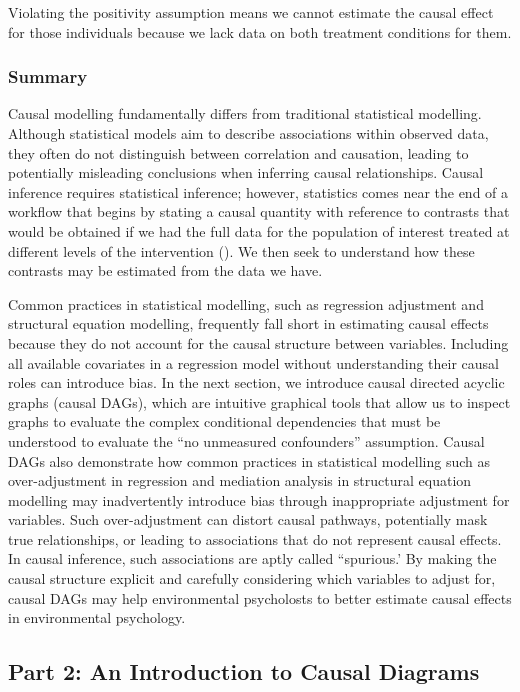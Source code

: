 \documentclass[
  singlecolumn]{article}
\begin{document}
Violating the positivity assumption means we cannot estimate the causal
effect for those individuals because we lack data on both treatment
conditions for them.

\subsubsection{Summary}\label{summary}

Causal modelling fundamentally differs from traditional statistical
modelling. Although statistical models aim to describe associations
within observed data, they often do not distinguish between correlation
and causation, leading to potentially misleading conclusions when
inferring causal relationships. Causal inference requires statistical
inference; however, statistics comes near the end of a workflow that
begins by stating a causal quantity with reference to contrasts that
would be obtained if we had the full data for the population of interest
treated at different levels of the intervention
(). We then seek to
understand how these contrasts may be estimated from the data we have.

Common practices in statistical modelling, such as regression adjustment
and structural equation modelling, frequently fall short in estimating
causal effects because they do not account for the causal structure
between variables. Including all available covariates in a regression
model without understanding their causal roles can introduce bias. In
the next section, we introduce causal directed acyclic graphs (causal
DAGs), which are intuitive graphical tools that allow us to inspect
graphs to evaluate the complex conditional dependencies that must be
understood to evaluate the ``no unmeasured confounders'' assumption.
Causal DAGs also demonstrate how common practices in statistical
modelling such as over-adjustment in regression and mediation analysis
in structural equation modelling may inadvertently introduce bias
through inappropriate adjustment for variables. Such over-adjustment can
distort causal pathways, potentially mask true relationships, or leading
to associations that do not represent causal effects. In causal
inference, such associations are aptly called ``spurious.' By making the
causal structure explicit and carefully considering which variables to
adjust for, causal DAGs may help environmental psycholosts to better
estimate causal effects in environmental psychology.

\subsection{Part 2: An Introduction to Causal
Diagrams}\label{section-part2}
\end{document}
